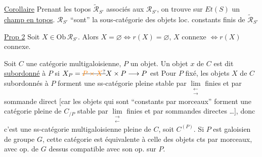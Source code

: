\uline{Corollaire} Prenant les topos  $\widetilde{\mathscr R}_{S'}$ associés aux $\mathscr R_{S'}$, on trouve sur $Et(S)$ un \uline{champ en topos}. $\mathscr R_{S'}$ ``sont'' la sous-catégorie des objets loc. constants finis de $\widetilde{\mathscr R}_{S'}$

\uline{Prop 2} Soit $X\in\mathrm{Ob}\,\mathscr R_{S'}$. Alors $X=\varnothing\Longleftrightarrow r(X)=\varnothing$, $X$ connexe $\Longleftrightarrow r(X)$ connexe.

Soit $C$ une catégorie multigaloisienne, $P$ un objet.
Un objet $x$ de $C$ est dit \uline{subordonné} à $P$ si $X_P=\deleted{\unsure{P\times X}}X\times P\longrightarrow P$ est 
Pour $P$ fixé, les objets $X$ de $C$ subordonnés à $P$ forment une ss-catégorie pleine stable par $\mathop{\mathrm{lim}}\limits_{\substack{\longleftarrow\\\longrightarrow}}$ finies et par sommande direct [car les objets  qui sont ``constants par morceaux'' forment une catégorie pleine de $C_{/P}$ stable par $\mathop{\mathrm{lim}}\limits_{\substack{\longrightarrow\\\longleftarrow}}$ finies et par sommandes directes \ldots],
donc c'est une ss-catégorie multigaloisienne pleine de $C$, soit $C^{(P)}$. Si $P$ est galoisien de groupe $G$, cette catégorie est équivalente à celle des objets  cts par morceaux,  avec op. de $G$ dessus compatible avec son op. sur $P$.

